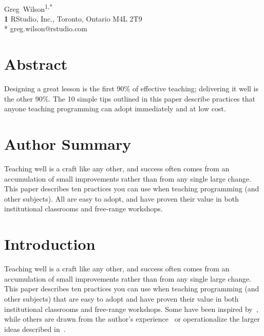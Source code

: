 \documentclass[10pt,letterpaper]{article}
\begin{document}
\vspace*{0.2in}

\begin{flushleft}
{\Large
\textbf{}
}
\newline
\\
{Greg~Wilson}\textsuperscript{1,*}
\\
\textbf{1} RStudio, Inc., Toronto, Ontario M4L 2T9
\\
\bigskip
* greg.wilson@rstudio.com
\end{flushleft}

\section*{Abstract}

Designing a great lesson is the first 90\% of effective teaching;
delivering it well is the other 90\%.
The 10 simple tips outlined in this paper
describe practices that anyone teaching programming can adopt immediately and at low cost.

\section*{Author Summary}

Teaching well is a craft like any other,
and success often comes from an accumulation of small improvements
rather than from any single large change.
This paper describes ten practices you can use when teaching programming (and other subjects).
All are easy to adopt,
and have proven their value in both institutional classrooms and free-range workshops.

\section*{Introduction}

Teaching well is a craft like any other,
and success often comes from an accumulation of small improvements
rather than from any single large change.
This paper describes ten practices you can use when teaching programming (and other subjects)
that are easy to adopt
and have proven their value in both institutional classrooms and free-range workshops.
Some have been inspired by~\cite{Hust2012,Lang2016,Lemo2014},
while others are drawn from the author's experience~\cite{Wils2016}
or operationalize the larger ideas described in~\cite{Brow2018,Deve2018}.
\end{document}
